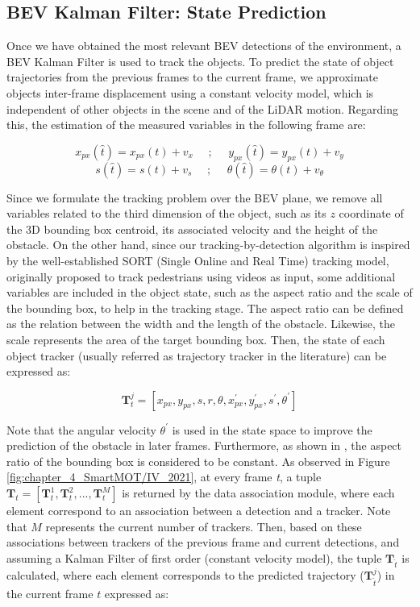\subsection{BEV Kalman Filter: State Prediction}
\label{subsec:4_smartmot_state_prediction}

Once we have obtained the most relevant \ac{BEV} detections of the environment, a \ac{BEV} Kalman Filter is used to track the objects. To predict the state of object trajectories from the previous frames to the current frame, we approximate objects inter-frame displacement using a constant velocity model, which is independent of other objects in the scene and of the LiDAR motion. Regarding this, the estimation of the measured variables in the following frame are:

\[
x_{px}(\hat{t})=x_{px}(t)+v_{x} \:\:\:\:\:\: ; \:\:\:\:\:\: y_{px}(\hat{t})=y_{px}(t)+v_{y}\]
\[
s(\hat{t})=s(t)+v_{s} \:\:\:\:\:\: ; \:\:\:\:\:\: 
\theta(\hat{t})=\theta(t)+v_{\theta}\]

Since we formulate the tracking problem over the \ac{BEV} plane, we remove all variables related to the third dimension of the object, such as its $\textit{z}$ coordinate of the 3D bounding box centroid, its associated velocity and the height of the obstacle. On the other hand, since our tracking-by-detection algorithm is inspired by the well-established SORT (Single Online and Real Time) \cite{bewley2016simple} tracking model, originally proposed to track pedestrians using videos as input, some additional variables are included in the object state, such as the aspect ratio and the scale of the bounding box, to help in the tracking stage. The aspect ratio can be defined as the relation between the width and the length of the obstacle. Likewise, the scale represents the area of the target bounding box. Then, the state of each object tracker (usually referred as trajectory tracker in the literature) can be expressed as:

\begin{equation}
	\label{state}
	\textbf{T}_{t}^{j} = [x_{px},y_{px},s,r,\theta,x_{px}^{'},y_{px}^{'},s^{'},\theta^{'}]
\end{equation}

Note that the angular velocity $\theta^{'}$ is used in the state space to improve the prediction of the obstacle in later frames. Furthermore, as shown in \cite{bewley2016simple}, the aspect ratio of the bounding box is considered to be constant. As observed in Figure \ref{fig:chapter_4_SmartMOT/IV_2021}, at every frame \textit{t}, a tuple $\textbf{T}_{t}=[\textbf{T}_{t}^{1},\textbf{T}_{t}^{2}, ...,\textbf{T}_{t}^{M}]$ is returned by the data association module, where each element correspond to an association between a detection and a tracker. Note that $M$ represents the current number of trackers. Then, based on these associations between trackers of the previous frame and current detections, and assuming a Kalman Filter of first order (constant velocity model), the tuple $\textbf{T}_{\hat{t}}$ is calculated, where each element corresponds to the predicted trajectory ($\textbf{T}_{\hat{t}}^{j}$) in the current frame $\textit{t}$ expressed as:

